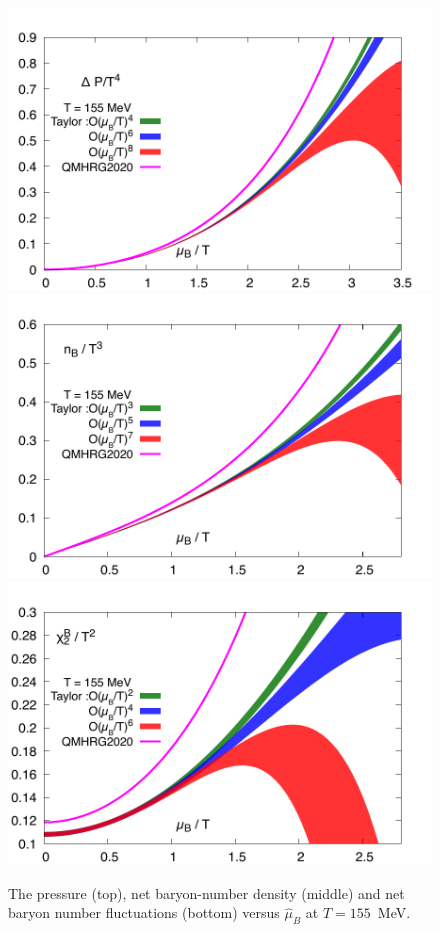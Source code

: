 \documentclass[pdflatex,prd,twocolumn,showpacs,superscriptaddress,nofootinbib]{revtex4-1}
\newcommand \hmu {\hat{\mu}}
\begin{document}
\begin{figure}[t]
\includegraphics[scale=0.45]{fig/Taylor_pressure_T155_comp.pdf}
\includegraphics[scale=0.45]{fig/Taylor_nB_T155_comp.pdf}
\includegraphics[scale=0.45]{fig/Taylor_X2B_T155_comp.pdf}
\caption{The pressure (top), net baryon-number
density (middle) and net baryon number fluctuations (bottom) versus $\hmu_B$ 
at $T=155$~MeV.}
\label{fig:mudep1}
\end{figure}
\end{document}
